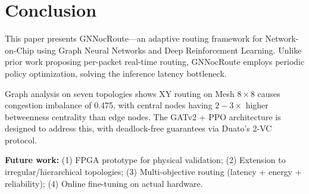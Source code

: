 \documentclass[conference]{IEEEtran}
\begin{document}
\section{Conclusion}
\label{sec:conclusion}

This paper presents GNNocRoute---an adaptive routing framework for Network-on-Chip using Graph Neural Networks and Deep Reinforcement Learning. Unlike prior work proposing per-packet real-time routing, GNNocRoute employs periodic policy optimization, solving the inference latency bottleneck.

Graph analysis on seven topologies shows XY routing on Mesh $8\times8$ causes congestion imbalance of 0.475, with central nodes having $2{-}3\times$ higher betweenness centrality than edge nodes. The GATv2 + PPO architecture is designed to address this, with deadlock-free guarantees via Duato's 2-VC protocol.

\textbf{Future work:} (1) FPGA prototype for physical validation; (2) Extension to irregular/hierarchical topologies; (3) Multi-objective routing (latency + energy + reliability); (4) Online fine-tuning on actual hardware.

\end{document}

